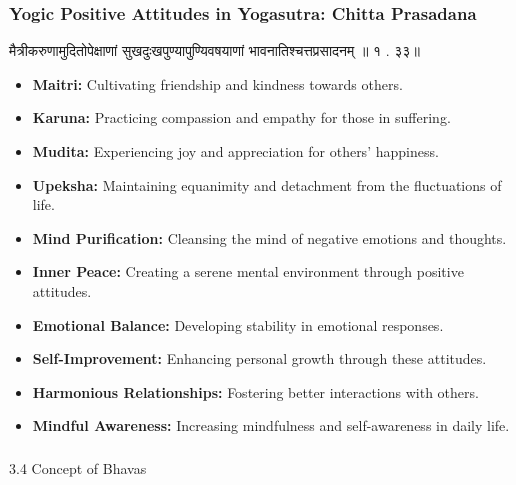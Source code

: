 \begin{frame}[fragile]\frametitle{Yogic Positive Attitudes in Yogasutra: Chitta Prasadana}

मैत्रीकरुणामुदितोपेक्षाणां सुखदुःखपुण्यापुण्यिवषयाणां भावनातिश्चत्तप्रसादनम् ॥   १ . ३३॥

      \begin{itemize}
        \item \textbf{Maitri:} Cultivating friendship and kindness towards others.
        \item \textbf{Karuna:} Practicing compassion and empathy for those in suffering.
        \item \textbf{Mudita:} Experiencing joy and appreciation for others' happiness.
        \item \textbf{Upeksha:} Maintaining equanimity and detachment from the fluctuations of life.
        \item \textbf{Mind Purification:} Cleansing the mind of negative emotions and thoughts.
        \item \textbf{Inner Peace:} Creating a serene mental environment through positive attitudes.
        \item \textbf{Emotional Balance:} Developing stability in emotional responses.
        \item \textbf{Self-Improvement:} Enhancing personal growth through these attitudes.
        \item \textbf{Harmonious Relationships:} Fostering better interactions with others.
        \item \textbf{Mindful Awareness:} Increasing mindfulness and self-awareness in daily life.
      \end{itemize}

\end{frame}

\begin{frame}[fragile]\frametitle{}
\begin{center}
{\Large 3.4 Concept of Bhavas}
\end{center}
\end{frame}



